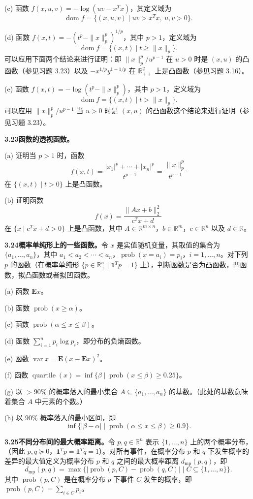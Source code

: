 \documentclass[UTF8,12pt,a4paper,fontset=fandol]{ctexart}
\DeclareMathOperator{\dom}{dom}
\begin{document}
(c) 函数 $f(x,u,v)=-\log(uv-x^Tx)$，其定义域为
\[
\dom f=\{(x,u,v)\mid uv>x^Tx,\ u,v>0\}.
\]

(d) 函数 $f(x,t)=-(t^p-\|x\|_p^p)^{1/p}$，其中 $p>1$，定义域为
\[
\dom f=\{(x,t)\mid t\geq\|x\|_p\}.
\]
可以应用下面两个结论来进行证明：即 $\|x\|_p^p/u^{p-1}$ 在 $u>0$ 时是 $(x,u)$ 的凸函数（参见习题 3.23）以及 $-x^{1/p}y^{1-1/p}$ 在 $\mathbb{R}_{++}^2$ 上是凸函数（参见习题 3.16）。

(e) 函数 $f(x,t)=-\log(t^p-\|x\|_p^p)$，其中 $p>1$，定义域为
\[
\dom f=\{(x,t)\mid t>\|x\|_p\}.
\]
可以应用 $\|x\|_p^p/u^{p-1}$ 当 $u>0$ 时是 $(x,u)$ 的凸函数这个结论来进行证明（参见习题 3.23）。

\noindent\textbf{3.23\quad 函数的透视函数。}

(a) 证明当 $p>1$ 时，函数
\[
f(x,t)=\frac{|x_1|^p+\cdots+|x_n|^p}{t^{p-1}}=\frac{\|x\|_p^p}{t^{p-1}}
\]
在 $\{(x,t)\mid t>0\}$ 上是凸函数。

(b) 证明函数
\[
f(x)=\frac{\|Ax+b\|_2^2}{c^Tx+d}
\]
在 $\{x\mid c^Tx+d>0\}$ 上是凸函数，其中 $A\in\mathbb{R}^{m\times n}$，$b\in\mathbb{R}^m$，$c\in\mathbb{R}^n$ 以及 $d\in\mathbb{R}$。

\noindent\textbf{3.24\quad 概率单纯形上的一些函数。}\quad 令 $x$ 是实值随机变量，其取值的集合为 $\{a_1,\ldots,a_n\}$，其中 $a_1<a_2<\cdots<a_n$，$\operatorname{prob}(x=a_i)=p_i$，$i=1,\ldots,n$。对下列 $p$ 的函数（在概率单纯形 $\{p\in\mathbb{R}_+^n\mid \mathbf{1}^Tp=1\}$ 上），判断函数是否为凸函数，凹函数，拟凸函数或者拟凹函数。

(a) 函数 $\mathbf{E}x$。

(b) 函数 $\operatorname{prob}(x\geq\alpha)$。

(c) 函数 $\operatorname{prob}(\alpha\leq x\leq\beta)$。

(d) 函数 $\sum_{i=1}^n p_i\log p_i$，即分布的负熵函数。

(e) 函数 $\operatorname{var}x=\mathbf{E}(x-\mathbf{E}x)^2$。

(f) 函数 $\operatorname{quartile}(x)=\inf\{\beta\mid \operatorname{prob}(x\leq\beta)\geq0.25\}$。

(g) 以 $>90\%$ 的概率落入的最小集合 $A\subseteq\{a_1,\ldots,a_n\}$ 的基数。（此处的基数意味着集合 $A$ 中元素的个数。）

(h) 以 $90\%$ 概率落入的最小区间，即
\[
\inf\{|\beta-\alpha|\mid \operatorname{prob}(\alpha\leq x\leq\beta)\geq0.9\}.
\]

\noindent\textbf{3.25\quad 不同分布间的最大概率距离。}\quad 令 $p,q\in\mathbb{R}^n$ 表示 $\{1,\ldots,n\}$ 上的两个概率分布，（因此 $p,q\succeq0$，$\mathbf{1}^Tp=\mathbf{1}^Tq=1$）。对所有事件，在概率分布 $p$ 和 $q$ 下发生概率的差异的最大值定义为概率分布 $p$ 和 $q$ 之间的最大概率距离 $d_{\mathrm{mp}}(p,q)$，即
\[
d_{\mathrm{mp}}(p,q)=\max\{|\operatorname{prob}(p,C)-\operatorname{prob}(q,C)|\mid C\subseteq\{1,\ldots,n\}\}.
\]
其中 $\operatorname{prob}(p,C)$ 是在概率分布 $p$ 下事件 $C$ 发生的概率，即 $\operatorname{prob}(p,C)=\sum_{i\in C}p_i$。
\end{document}
